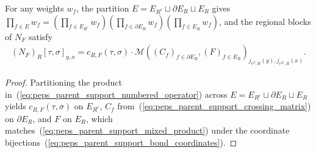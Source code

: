 \begin{lemma}%
    \label{thm:peps_parent_support_bond_blocks}
    \leanok
    For any weights $w_f$, the partition $E=E_{R^c}\sqcup\partial E_R\sqcup E_R$
    gives $\prod_{f\in E}w_f=(\prod_{f\in E_{R^c}}w_f)(\prod_{f\in\partial E_R}w_f)(\prod_{f\in E_R}w_f)$,
    and the regional blocks of $N_F$ satisfy
    \begin{align}
        (N_F)_R[\tau,\sigma]_{y,x}
        =c_{R,F}(\tau,\sigma)\cdot
        \mathcal M((C_f)_{f\in\partial E_R},(F)_{f\in E_R})_
        {j_{e^Y,R}(y),j_{e^X,R}(x)}.
        \label{eq:peps_parent_support_bond_blocks}
    \end{align}
\end{lemma}
\begin{proof}\leanok
    Partitioning the product in~(\ref{eq:peps_parent_support_numbered_operator})
    across $E=E_{R^c}\sqcup\partial E_R\sqcup E_R$ yields $c_{R,F}(\tau,\sigma)$ on
    $E_{R^c}$, $C_f$ from~(\ref{eq:peps_parent_support_crossing_matrix}) on
    $\partial E_R$, and $F$ on $E_R$, which matches~(\ref{eq:peps_parent_support_mixed_product})
    under the coordinate bijections~(\ref{eq:peps_parent_support_bond_coordinates}).
\end{proof}

